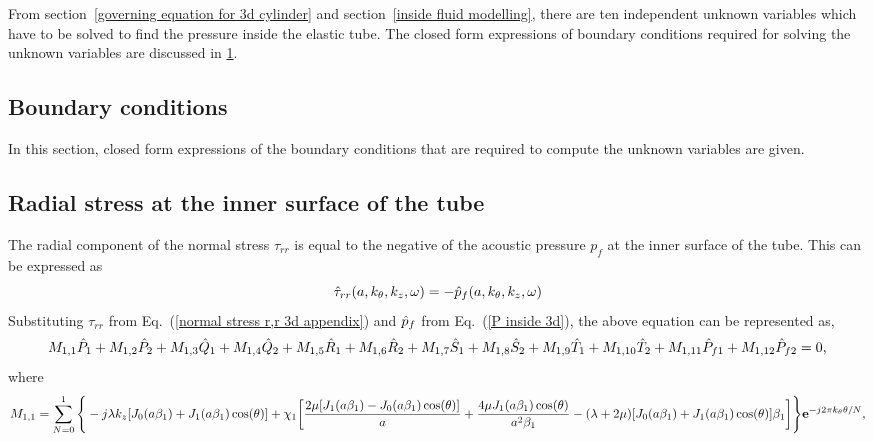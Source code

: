 \documentclass[10pt]{asme2ej}
\begin{document}
From section~\ref{governing equation for 3d cylinder} and section~\ref{inside fluid modelling}, there are ten independent unknown variables which have to be solved to find the pressure inside the elastic tube. The closed form expressions of boundary conditions required for solving the unknown variables are discussed in \ref{boundary condition 3d appendix}. 
\begin{landscape}

\section{Boundary conditions}\label{boundary condition 3d appendix}
In this section, closed form expressions of the boundary conditions that are required to compute the unknown variables are given. 
\subsection{Radial stress at the inner surface of the tube}\label{BC1 3d appendix}
\tiny
The radial component of the normal stress $\tau_{rr}$ is equal to the negative of the acoustic pressure $p_f$ at the inner surface of the tube. This can be expressed as
\begin{equation}
    \Hat{\tau}_{rr}(a,k_\theta,k_{z},\omega) = -\Hat{p}_{f}(a,k_\theta,k_{z},\omega)
\end{equation}
Substituting $\tau_{rr}$ from Eq.~(\ref{normal stress r,r 3d appendix}) and $\Hat{p}_{f}$ from Eq.~(\ref{P inside 3d}), the above equation can be represented as, 
\begin{equation}\label{BC1 equation 3d appendix}  
    M_{1,1}\Hat{P}_1 + M_{1,2}\Hat{P}_2 + M_{1,3}\Hat{Q}_1 + M_{1,4}\Hat{Q}_2 + M_{1,5}\Hat{R}_1 +  M_{1,6}\Hat{R}_2 + M_{1,7}\Hat{S}_1 + M_{1,8}\Hat{S}_2\\ + M_{1,9}\Hat{T}_1 + M_{1,10}\Hat{T}_2 + M_{1,11}\Hat{P}_{f1} + M_{1,12}\Hat{P}_{f2} = 0,
\end{equation}
where
\begin{equation}
    M_{1,1} = \sum_{N=0}^{1}\Bigg\{-j\lambda k_z[J_0(a\beta_1)+J_1(a\beta_1)\cos(\theta)]\\ + \chi_1 \bigg[\frac{2\mu[J_1(a\beta_1)-J_0(a\beta_1)\cos(\theta)]}{a} + \frac{4\mu J_1(a\beta_1)\cos(\theta)}{a^2 \beta_1}\\ - (\lambda+2\mu)[J_0(a\beta_1)+J_1(a\beta_1)\cos(\theta)]\beta_1 \bigg]\Bigg\}\mathbf{e}^{-j2\pi k_\theta\theta/N},
\end{equation}
\begin{equation}

\end{equation}
\end{landscape}
\end{document}
